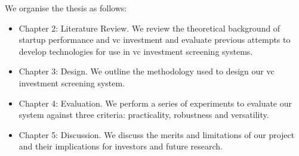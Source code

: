 \documentclass[../thesis/thesis.tex]{subfiles}
\begin{document}
We organise the thesis as follows:

\begin{itemize}

\item Chapter 2: Literature Review. We review the theoretical background of startup performance and \gls{vc} investment and evaluate previous attempts to develop technologies for use in \gls{vc} investment screening systems.

\item Chapter 3: Design. We outline the methodology used to design our \gls{vc} investment screening system.

\item Chapter 4: Evaluation. We perform a series of experiments to evaluate our system against three criteria: practicality, robustness and versatility.

\item Chapter 5: Discussion. We discuss the merits and limitations of our project and their implications for investors and future research.

\end{itemize}

\end{document}

